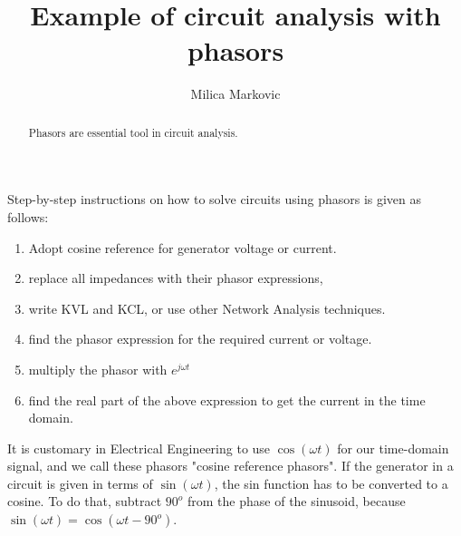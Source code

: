 \documentclass{ximera}
\title{Example of circuit analysis with phasors}
\author{Milica Markovic}
\begin{document}
  
\begin{abstract}  
Phasors are essential tool in circuit analysis.
\end{abstract}  
\maketitle    




 Step-by-step instructions on how to solve circuits using phasors is given as follows:
\begin{enumerate}
\item Adopt cosine reference for generator voltage or current. 
\item replace all impedances with their phasor expressions,
\item write KVL and KCL, or use other Network Analysis techniques.
\item find the phasor expression for the required current or voltage. 
\item multiply the phasor with $e^{j \omega t}$  
\item find the real part of the above expression to get the current in the time domain.
\end{enumerate}


It is customary in Electrical Engineering to use  $\cos( \omega t)$ for our time-domain signal, and we call these phasors "cosine reference phasors".  If the generator in a circuit is given in terms of $\sin (\omega t)$, the sin function has to be converted to a cosine. To do that, subtract $90^o$ from the phase of the sinusoid, because $\sin( \omega t) = \cos(\omega t - 90^o)$.
\end{document}
